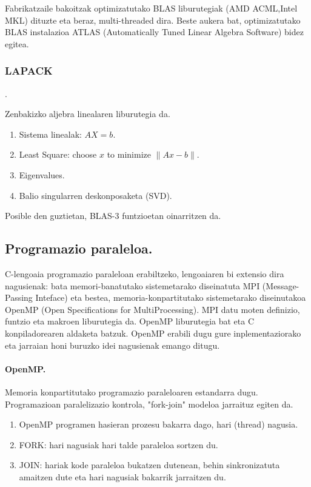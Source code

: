 Fabrikatzaile bakoitzak optimizatutako BLAS liburutegiak (AMD ACML,Intel MKL) dituzte eta beraz, multi-threaded dira.
Beste aukera bat, optimizatutako BLAS instalazioa ATLAS (Automatically Tuned Linear Algebra Software) bidez egitea.    

\subsubsection*{\textbf{LAPACK}}.

Zenbakizko aljebra linealaren liburutegia da.

\begin{enumerate}
\item Sistema linealak: $AX=b$.
\item Least Square: choose $x$ to minimize $\|Ax-b\|$.
\item Eigenvalues.
\item Balio singularren deskonposaketa (SVD).
\end{enumerate}

Posible den guztietan, BLAS-3 funtzioetan oinarritzen da.

\subsection{Programazio paraleloa.}

C-lengoaia programazio paraleloan erabiltzeko, lengoaiaren bi extensio dira nagusienak: bata memori-banatutako sistemetarako diseinatuta  MPI (Message-Passing Inteface) eta bestea, memoria-konpartitutako sistemetarako diseinutakoa OpenMP (Open Specifications for MultiProcessing). MPI datu moten definizio, funtzio eta makroen liburutegia da. OpenMP liburutegia bat  eta C konpiladorearen aldaketa batzuk. OpenMP erabili dugu gure inplementaziorako eta jarraian honi buruzko idei nagusienak emango ditugu.

\paragraph*{\textbf{OpenMP}.}

Memoria konpartitutako programazio paraleloaren estandarra dugu. 
Programazioan paralelizazio kontrola, "fork-join" modeloa jarraituz egiten da.

\begin{enumerate}
\item OpenMP programen hasieran prozesu bakarra dago, hari (thread) nagusia. 
\item FORK: hari nagusiak hari talde paraleloa sortzen du.
\item JOIN: hariak kode paraleloa bukatzen dutenean, behin sinkronizatuta amaitzen dute eta hari nagusiak bakarrik jarraitzen du.
\end{enumerate}

